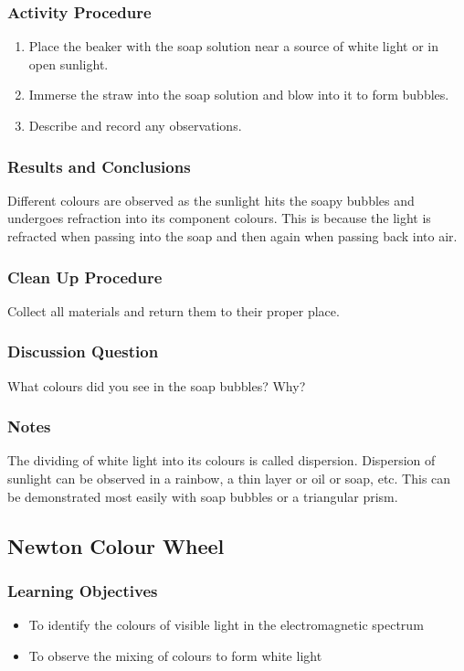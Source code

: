 \subsubsection*{Activity Procedure}
\begin{enumerate}
\item{Place the beaker with the soap solution near a source of white light or in open sunlight.} 
\item{Immerse the straw into the soap solution and blow into it to form bubbles.} 
\item{Describe and record any observations.} 
\end{enumerate}

\subsubsection*{Results and Conclusions}
Different colours are observed as the sunlight hits the soapy bubbles and undergoes refraction into its component colours.  This is because the light is refracted when passing into the soap and then again when passing back into air.

\subsubsection*{Clean Up Procedure}
Collect all materials and return them to their proper place.

\subsubsection*{Discussion Question}
What colours did you see in the soap bubbles? Why?

\subsubsection*{Notes}
The dividing of white light into its colours is called dispersion.  Dispersion of sunlight can be observed in a rainbow, a thin layer or oil or soap, etc.  This can be demonstrated most easily with soap bubbles or a triangular prism.

\subsection{Newton Colour Wheel}

\subsubsection*{Learning Objectives}
\begin{itemize}
\item{To identify the colours of visible light in the electromagnetic spectrum} 
\item{To observe the mixing of colours to form white light} 
\end{itemize}

